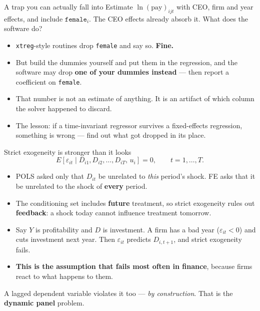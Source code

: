 \documentclass[
  11pt,
  ignorenonframetext,
  aspectratio=169,
]{beamer}
\providecommand{\tightlist}{%
  \setlength{\itemsep}{0pt}\setlength{\parskip}{0pt}}
\begin{document}
\begin{frame}[fragile]{A trap you can actually fall into}
\protect{}\label{a-trap-you-can-actually-fall-into}
Estimate \(\ln(\text{pay})_{ijt}\) with CEO, firm and year effects, and
include \(\texttt{female}_i\). The CEO effects already absorb it. What
does the software do?

\vspace{0.3em}

\begin{itemize}
\tightlist
\item
  \texttt{xtreg}-style routines drop \texttt{female} and say so.
  \textbf{Fine.}
\item
  But build the dummies yourself and put them in the regression, and the
  software may drop \textbf{one of your dummies instead} --- then report
  a coefficient on \texttt{female}.
\item
  That number is not an estimate of anything. It is an artifact of which
  column the solver happened to discard.
\end{itemize}

\vspace{0.3em}

\begin{itemize}
\tightlist
\item
  The lesson: if a time-invariant regressor survives a fixed-effects
  regression, something is wrong --- find out what got dropped in its
  place.
\end{itemize}
\end{frame}

\begin{frame}{Strict exogeneity is stronger than it looks}
\protect{}\label{strict-exogeneity-is-stronger-than-it-looks}
\[
E[\varepsilon_{it} \mid D_{i1}, D_{i2}, \dots, D_{iT},\, u_i] = 0, \qquad t = 1, \dots, T .
\]

\begin{itemize}
\tightlist
\item
  POLS asked only that \(D_{it}\) be unrelated to \emph{this} period's
  shock. FE asks that it be unrelated to the shock of \textbf{every}
  period.
\item
  The conditioning set includes \textbf{future} treatment, so strict
  exogeneity rules out \textbf{feedback}: a shock today cannot influence
  treatment tomorrow.
\item
  Say \(Y\) is profitability and \(D\) is investment. A firm has a bad
  year (\(\varepsilon_{it} < 0\)) and cuts investment next year. Then
  \(\varepsilon_{it}\) predicts \(D_{i,t+1}\), and strict exogeneity
  fails.
\item
  \textbf{This is the assumption that fails most often in finance},
  because firms react to what happens to them.
\end{itemize}

\vspace{0.3em}

A lagged dependent variable violates it too --- \emph{by construction}.
That is the \textbf{dynamic panel} problem.
\end{frame}
\end{document}
